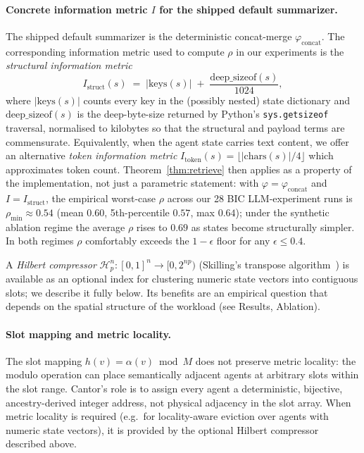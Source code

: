 \documentclass[fleqn,10pt]{article}
\theoremstyle{definition}
\newcommand{\info}{I}
\newcommand{\summarize}{\varphi}
\newcommand{\cantor}{\alpha}
\newcommand{\hilbert}{\mathcal{H}}
\newcommand{\preserv}{\rho}
\newcommand{\slots}{M}
\begin{document}
\paragraph{Concrete information metric $\info$ for the shipped default summarizer.}
The shipped default summarizer is the deterministic concat-merge
$\summarize_{\text{concat}}$. The corresponding information metric used
to compute $\preserv$ in our experiments is the \emph{structural
information metric}
\[
  \info_{\text{struct}}(s) \;=\; |\text{keys}(s)| \;+\; \frac{\mathrm{deep\_sizeof}(s)}{1024},
\]
where $|\text{keys}(s)|$ counts every key in the (possibly nested)
state dictionary and $\mathrm{deep\_sizeof}(s)$ is the
deep-byte-size returned by Python's \texttt{sys.getsizeof} traversal,
normalised to kilobytes so that the structural and payload terms
are commensurate. Equivalently, when the agent state carries text
content, we offer an alternative \emph{token information metric}
$\info_{\text{token}}(s) = \lfloor |\text{chars}(s)| / 4 \rfloor$
which approximates token count. Theorem~\ref{thm:retrieve} then
applies as a property of the implementation, not just a parametric
statement: with $\summarize \!=\! \summarize_{\text{concat}}$ and
$\info \!=\! \info_{\text{struct}}$, the empirical worst-case
$\preserv$ across our 28 BIC LLM-experiment runs is
$\preserv_{\min} \!\approx\! 0.54$ (mean $0.60$, 5th-percentile
$0.57$, max $0.64$); under the synthetic ablation regime the
average $\preserv$ rises to $0.69$ as states become structurally
simpler. In both regimes $\preserv$ comfortably exceeds the
$1 - \epsilon$ floor for any $\epsilon \leq 0.4$.

A \emph{Hilbert compressor} $\hilbert_p^n: [0,1]^n \to [0, 2^{np})$
(Skilling's transpose algorithm~\citep{skilling2004hilbert}) is
available as an optional index for clustering numeric state vectors
into contiguous slots; we describe it fully below. Its benefits are
an empirical question that depends on the spatial structure of the
workload (see Results, Ablation).

\paragraph{Slot mapping and metric locality.}
The slot mapping $h(v) = \cantor(v) \bmod \slots$ does not preserve
metric locality: the modulo operation can place semantically
adjacent agents at arbitrary slots within the slot range. Cantor's
role is to assign every agent a deterministic, bijective,
ancestry-derived integer address, not physical adjacency in the
slot array. When metric locality is required (e.g.\ for
locality-aware eviction over agents with numeric state vectors), it
is provided by the optional Hilbert compressor described above.
\end{document}
